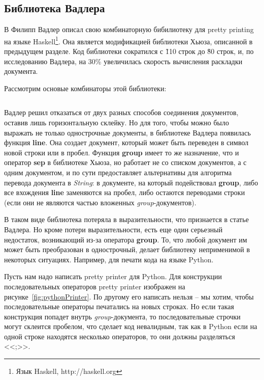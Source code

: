 \newpage

\subsection{Библиотека Вадлера}

В \cite{wadler} Филипп Вадлер описал свою комбинаторную бибилиотеку для pretty printing на языке Haskell\footnote{Язык Haskell, http://haskell.org}. Она является модификацией библиотеки Хьюза, описанной в предыдущем разделе. Код библиотеки сократился с \~110 строк до \~80 строк, и, по исследованию Вадлера, на 30\% увеличилась скорость вычисления раскладки документа.

Рассмотрим основые комбинаторы этой библиотеки:
\inputminted{haskell}{codes/wadlerBasicOperations.hs}

Вадлер решил отказаться от двух разных способов соединения документов, оставив лишь горизонтальную склейку. Но для того, чтобы можно было выражать не только однострочные документы, в библиотеке Вадлера появилась функция \textbf{line}. Она создает документ, который может быть переведен в символ новой строки или в пробел.
Функция \textbf{group} имеет то же назначение, что и оператор \textbf{sep} в библиотеке Хьюза, но работает не со списком документов, а с одним документом, и по сути предоставляет альтернативы для алгоритма перевода документа в \textit{String}: в документе, на который подействовал \textbf{group}, либо все вхождения \textbf{line} заменяются на пробел, либо остаются переводами строки (если они не являются частью вложенных \textit{group}-документов).

В таком виде библиотека потеряла в выразительности, что признается в статье Вадлера. Но кроме потери выразительности, есть еще один серьезный недостаток, возникающий из-за оператора \textbf{group}. То, что любой документ им может быть преобразован в однострочный, делает библиотеку неприменимой в некоторых ситуациях. Например, для печати кода на языке Python.

Пусть нам надо написать pretty printer для Python. Для конструкции последовательных операторов pretty printer изображен на рисунке~\ref{fig:pythonPrinter}.
По другому его написать нельзя -- мы хотим, чтобы последовательные операторы печатались на новых строках. Но если такая конструкция попадет внутрь \textit{group}-документа, то последовательные строчки могут склеится пробелом, что сделает код невалидным, так как в Python если на одной строке находятся несколько операторов, то они должны разделяться <<;>>.


